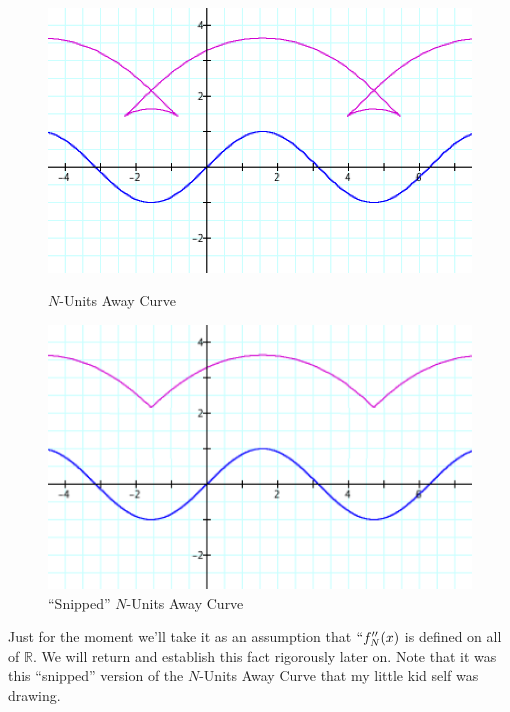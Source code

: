 \begin{figure}[h!] 
  \label{formal-1} 
  \begin{minipage}[b]{0.45\linewidth}
    \centering
    \includegraphics[width=\linewidth]{formal-definitions-img/Fig 13.png}
    \caption{$N$-Units Away Curve}
    \label{fig:fig13}
    \vspace{4ex}
  \end{minipage} %
  \begin{minipage}[b]{0.45\linewidth}
    \centering
    \includegraphics[width=\linewidth]{formal-definitions-img/Fig 14.png}
    \caption{``Snipped'' $N$-Units Away Curve}
    \label{fig:fig14}
    \vspace{4ex}
  \end{minipage} %
\end{figure}

Just for the moment we'll take it as an assumption that $``f_N''(x)$ is defined on all of $\mathbb{R}$. We will return and establish this fact rigorously later on. Note that it was this ``snipped'' version of the $N$-Units Away Curve that my little kid self was drawing.